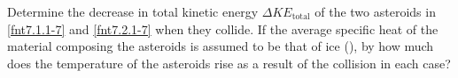 \label{fnt7.2.1-8}

Determine the decrease in total kinetic energy $\Delta KE_\text{total}$ of the two asteroids in \ref{fnt7.1.1-7} and \ref{fnt7.2.1-7} when they collide.  If the average specific heat of the material composing the asteroids is assumed to be that of ice (), by how much does the temperature of the asteroids rise as a result of the collision in each case?